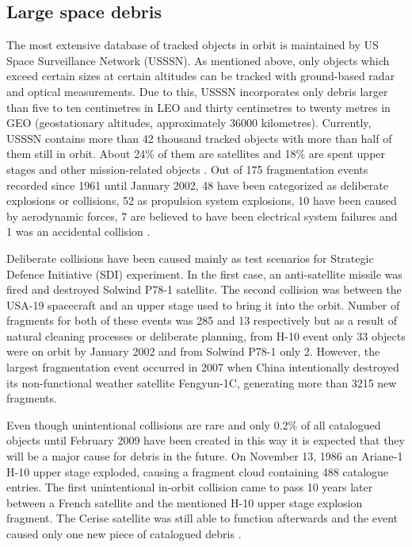\subsection{Large space debris}\label{subsec:large_space_debris}
The most extensive database of tracked objects in orbit is maintained by US Space Surveillance Network (USSSN). As mentioned above, only objects which exceed certain sizes at certain altitudes can be tracked with ground-based radar and optical measurements. Due to this, USSSN incorporates only debris larger than five to ten centimetres in LEO and thirty centimetres to twenty metres in GEO (geostationary altitudes, approximately 36000 kilometres). Currently, USSSN contains more than 42 thousand tracked objects with more than half of them still in orbit. About 24\% of them are satellites and 18\% are spent upper stages and other mission-related objects \citep{esabr336}. Out of 175 fragmentation events recorded since 1961 until January 2002, 48 have been categorized as deliberate explosions or collisions, 52 as propulsion system explosions, 10 have been caused by aerodynamic forces, 7 are believed to have been electrical system failures and 1 was an accidental collision \citep{klinkrad2006space}. 

	Deliberate collisions have been caused mainly as test scenarios for Strategic Defence Initiative (SDI) experiment. In the first case, an anti-satellite missile was fired and destroyed Solwind P78-1 satellite. The second collision was between the USA-19 spacecraft and an upper stage used to bring it into the orbit. Number of fragments for both of these events was 285 and 13 respectively but as a result of natural cleaning processes or deliberate planning, from H-10 event only 33 objects were on orbit by January 2002 and from Solwind P78-1 only 2. However, the largest fragmentation event occurred in 2007 when China intentionally destroyed its non-functional weather satellite Fengyun-1C, generating more than 3215 new fragments. 
	
	Even though unintentional collisions are rare and only 0.2\% of all catalogued objects until February 2009 have been created in this way it is expected that they will be a major cause for debris in the future. On November 13, 1986 an Ariane-1 H-10 upper stage exploded, causing a fragment cloud containing 488 catalogue entries. The first unintentional in-orbit collision came to pass 10 years later between a French satellite and the mentioned H-10 upper stage explosion fragment. The Cerise satellite was still able to function afterwards and the event caused only one new piece of catalogued debris \citep{Silha2012id}. 
	
